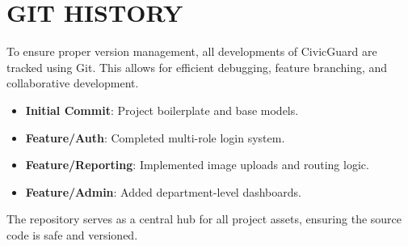 \chapter{GIT HISTORY}
To ensure proper version management, all developments of CivicGuard are tracked using Git. This allows for efficient debugging, feature branching, and collaborative development.

\begin{itemize}
    \item \textbf{Initial Commit}: Project boilerplate and base models.
    \item \textbf{Feature/Auth}: Completed multi-role login system.
    \item \textbf{Feature/Reporting}: Implemented image uploads and routing logic.
    \item \textbf{Feature/Admin}: Added department-level dashboards.
\end{itemize}

The repository serves as a central hub for all project assets, ensuring the source code is safe and versioned.
